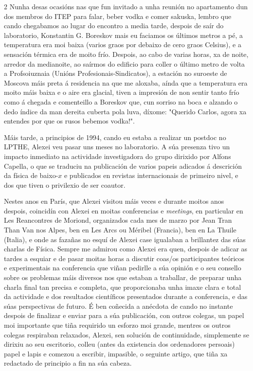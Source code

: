 \begin{multicols}{2}
Nunha desas ocasións nas que fun invitado a unha reunión no apartamento dun dos
membros do ITEP para falar, beber vodka e comer sakuska, lembro que cando
chegabamos ao lugar do encontro a media tarde, despois de saír do laboratorio,
Konstantin G. Boreskov mais eu faciamos os últimos metros a pé, a temperatura
era moi baixa (varios graos por debaixo de cero graos Celsius), e a sensación
térmica era de moito frío. Despois, ao cabo de varias horas, xa de noite,
arredor da medianoite, ao saírmos do edificio para coller o último metro de
volta a Profsoiuznaia (Unións Profesionais-Sindicatos), a estación no suroeste
de Moscova máis preta á residencia na que me aloxaba, aínda que a temperatura
era moito máis baixa e o aire era glacial, tiven a impresión de non sentir
tanto frío como á chegada e comenteillo a Boreskov que, cun sorriso na boca e
alzando o dedo índice da man dereita cuberta pola luva, díxome: "Querido
Carlos, agora xa entendes por que os rusos bebemos vodka!".

Máis tarde, a principios de 1994, cando eu estaba a realizar un postdoc no
LPTHE, Alexei veu pasar uns meses no laboratorio. A súa presenza tivo un
impacto inmediato na actividade investigadora do grupo dirixido por Alfons
Capella, o que se traduciu na publicación de varios papeis adicados á
descrición da física de baixo-$x$ e publicados en revistas internacionais de
primeiro nivel, e dos que tiven o privilexio de ser coautor.

Nestes anos en París, que Alexei visitou máis veces e durante moitos anos
despois, coincidín con Alexei en moitas conferencias e \textit{meetings}, en
particular en Les Reancontres de Moriond, organizados cada mes de marzo por
Jean Tran Than Van nos Alpes, ben en Les Arcs ou Méribel (Francia), ben en La
Thuile (Italia), e onde as fazañas no esquí de Alexei case igualaban a
brillantez das súas charlas de Física. Sempre me admirou como Alexei era quen,
despois de adicar as tardes a esquiar e de pasar moitas horas a discutir
coas/os participantes teóricos e experimentais na conferencia que viñan
pedirlle a súa opinión e o seu consello sobre os problemas máis diversos nos
que estaban a traballar, de preparar unha charla final tan precisa e completa,
que proporcionaba unha imaxe clara e total da actividade e dos resultados
científicos presentados durante a conferencia, e das súas perspectivas de
futuro. É ben coñecida a anécdota de cando no instante despois de finalizar e
enviar para a súa publicación, con outros colegas, un papel moi importante que
tiña requirido un esforzo moi grande, mentres os outros colegas respiraban
relaxados, Alexei, sen solución de continuidade, simplemente se dirixiu ao seu
escritorio, colleu (antes da existencia dos ordenadores persoais) papel e lapis
e comezou a escribir, impasible, o seguinte artigo, que tiña xa redactado de
principio a fin na súa cabeza.


\end{multicols}
